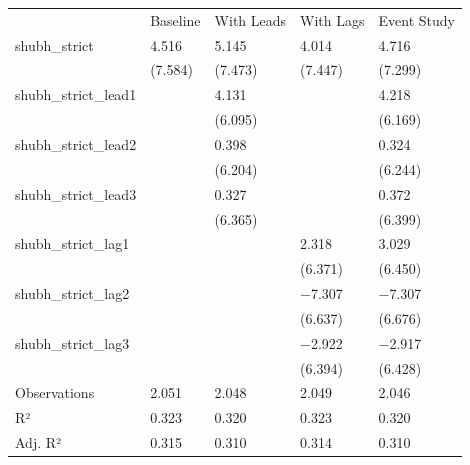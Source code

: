 \begin{tabular}{lllll}
& Baseline & With Leads & With Lags & Event Study \\
shubh\_strict & \num{4.516} & \num{5.145} & \num{4.014} & \num{4.716} \\
& (\num{7.584}) & (\num{7.473}) & (\num{7.447}) & (\num{7.299}) \\
shubh\_strict\_lead1 &  & \num{4.131} &  & \num{4.218} \\
&  & (\num{6.095}) &  & (\num{6.169}) \\
shubh\_strict\_lead2 &  & \num{0.398} &  & \num{0.324} \\
&  & (\num{6.204}) &  & (\num{6.244}) \\
shubh\_strict\_lead3 &  & \num{0.327} &  & \num{0.372} \\
&  & (\num{6.365}) &  & (\num{6.399}) \\
shubh\_strict\_lag1 &  &  & \num{2.318} & \num{3.029} \\
&  &  & (\num{6.371}) & (\num{6.450}) \\
shubh\_strict\_lag2 &  &  & \num{-7.307} & \num{-7.307} \\
&  &  & (\num{6.637}) & (\num{6.676}) \\
shubh\_strict\_lag3 &  &  & \num{-2.922} & \num{-2.917} \\
&  &  & (\num{6.394}) & (\num{6.428}) \\
Observations & \num{2,051} & \num{2,048} & \num{2,049} & \num{2,046} \\
R² & \num{0.323} & \num{0.320} & \num{0.323} & \num{0.320} \\
Adj. R² & \num{0.315} & \num{0.310} & \num{0.314} & \num{0.310} \\
\end{tabular}
